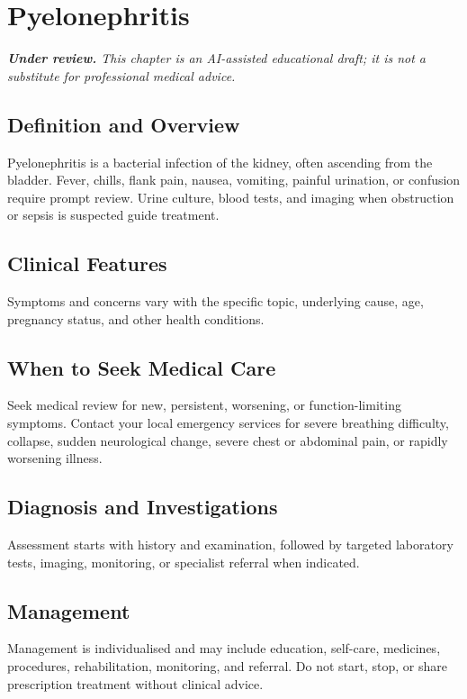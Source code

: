 \chapter{Pyelonephritis}

\medskip
\noindent\textit{\textbf{Under review.} This chapter is an AI-assisted educational draft; it is not a substitute for professional medical advice.}

\section*{Definition and Overview}
Pyelonephritis is a bacterial infection of the kidney, often ascending from the bladder. Fever, chills, flank pain, nausea, vomiting, painful urination, or confusion require prompt review. Urine culture, blood tests, and imaging when obstruction or sepsis is suspected guide treatment.

\section*{Clinical Features}
Symptoms and concerns vary with the specific topic, underlying cause, age, pregnancy status, and other health conditions.

\section*{When to Seek Medical Care}
Seek medical review for new, persistent, worsening, or function-limiting symptoms. Contact your local emergency services for severe breathing difficulty, collapse, sudden neurological change, severe chest or abdominal pain, or rapidly worsening illness.

\section*{Diagnosis and Investigations}
Assessment starts with history and examination, followed by targeted laboratory tests, imaging, monitoring, or specialist referral when indicated.

\section*{Management}
Management is individualised and may include education, self-care, medicines, procedures, rehabilitation, monitoring, and referral. Do not start, stop, or share prescription treatment without clinical advice.


